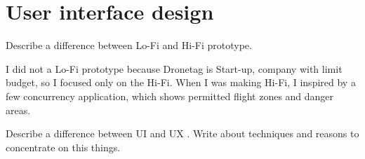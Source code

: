\chapter{User interface design}\label{ch:user-interface-design}

Describe a difference between Lo-Fi and Hi-Fi prototype.

I did not a Lo-Fi prototype because Dronetag is Start-up, company with limit budget, so I focused only on the Hi-Fi.
When I was making Hi-Fi, I inspired by a few concurrency application, which shows permitted flight zones and danger areas.

Describe a difference between UI and UX .
Write about techniques and reasons to concentrate on this things.



